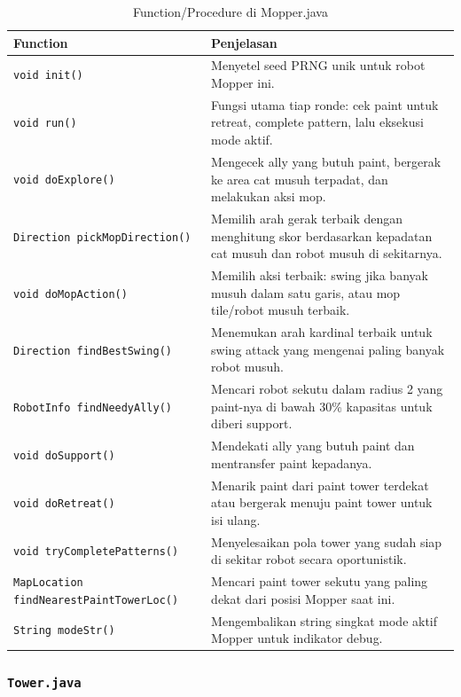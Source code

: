 \documentclass{article}
\begin{document}
\begin{enumerate}[label=\alph*.]
\begin{longtable}{|p{}|p{}|}
    \caption{Function/Procedure di Mopper.java} \\
\hline
\textbf{Function} & \textbf{Penjelasan} \\
\hline
\endhead
\hline
\endfoot
\texttt{void init()} & Menyetel seed PRNG unik untuk robot Mopper ini. \\
\hline
\texttt{void run()} & Fungsi utama tiap ronde: cek paint untuk retreat, complete pattern, lalu eksekusi mode aktif. \\
\hline
\texttt{void doExplore()} & Mengecek ally yang butuh paint, bergerak ke area cat musuh terpadat, dan melakukan aksi mop. \\
\hline
\texttt{Direction pickMopDirection()} & Memilih arah gerak terbaik dengan menghitung skor berdasarkan kepadatan cat musuh dan robot musuh di sekitarnya. \\
\hline
\texttt{void doMopAction()} & Memilih aksi terbaik: swing jika banyak musuh dalam satu garis, atau mop tile/robot musuh terbaik. \\
\hline
\texttt{Direction findBestSwing()} & Menemukan arah kardinal terbaik untuk swing attack yang mengenai paling banyak robot musuh. \\
\hline
\texttt{RobotInfo findNeedyAlly()} & Mencari robot sekutu dalam radius 2 yang paint-nya di bawah 30\% kapasitas untuk diberi support. \\
\hline
\texttt{void doSupport()} & Mendekati ally yang butuh paint dan mentransfer paint kepadanya. \\
\hline
\texttt{void doRetreat()} & Menarik paint dari paint tower terdekat atau bergerak menuju paint tower untuk isi ulang. \\
\hline
\texttt{void tryCompletePatterns()} & Menyelesaikan pola tower yang sudah siap di sekitar robot secara oportunistik. \\
\hline
\texttt{MapLocation findNearestPaintTowerLoc()} & Mencari paint tower sekutu yang paling dekat dari posisi Mopper saat ini. \\
\hline
\texttt{String modeStr()} & Mengembalikan string singkat mode aktif Mopper untuk indikator debug. \\
\hline
\end{longtable}

\subsubsection{\lstinline|Tower.java|}


\end{enumerate}
\end{document}
